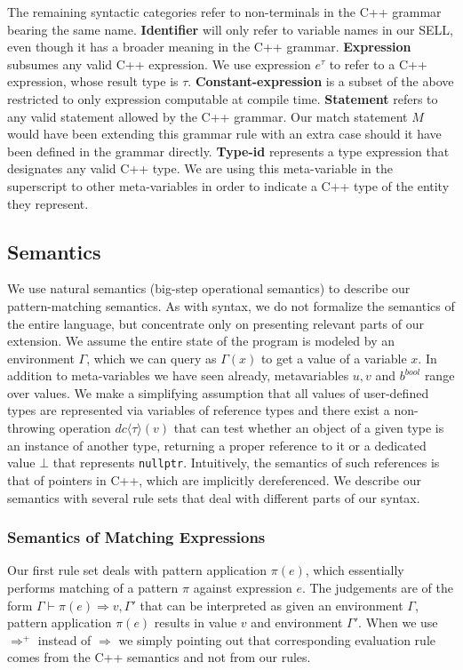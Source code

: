 \documentclass[preprint]{sigplanconf}
\makeatletter
\DeclareRobustCommand{\code}[1]{{\lstinline[breaklines=false,escapechar=@]{#1}}}
\newcommand{\evals}{\Rightarrow}
\newcommand{\evalspp}{\Rightarrow^+}
\newcommand{\DynCast}[2]{\ensuremath{dc\langle{#1}\rangle({#2})}}
\newcommand{\nullptr}{\ensuremath{\bot}}
\makeatother
\begin{document}
The remaining syntactic categories refer to non-terminals in the C++ grammar 
bearing the same name. {\bf Identifier} will only refer to variable names in our 
SELL, even though it has a broader meaning in the C++ grammar. {\bf Expression}
subsumes any valid C++ expression. We use expression $e^\tau$ to refer to a C++ 
expression, whose result type is $\tau$. {\bf Constant-expression} is a subset 
of the above restricted to only expression computable at compile time. {\bf 
Statement} refers to any valid statement allowed by the C++ grammar. Our match 
statement $M$ would have been extending this grammar rule with an extra case 
should it have been defined in the grammar directly. {\bf Type-id} represents a 
type expression that designates any valid C++ type. We are using this 
meta-variable in the superscript to other meta-variables in order to indicate a 
C++ type of the entity they represent.

\subsection{Semantics}
\label{sec:sem}

We use natural semantics\cite{Kahn87} (big-step operational semantics) to 
describe our pattern-matching semantics. As with syntax, we do not formalize the 
semantics of the entire language, but concentrate only on presenting relevant 
parts of our extension. We assume the entire state of the program is modeled by 
an environment $\Gamma$, which we can query as $\Gamma(x)$ to get a value of a 
variable $x$. In addition to meta-variables we have seen already, metavariables 
$u,v$ and $b^{bool}$ range over values. We make a simplifying assumption that 
all values of user-defined types are represented via variables of reference 
types and there exist a non-throwing operation \DynCast{\tau}{v} that can test 
whether an object of a given type is an instance of another type, returning a 
proper reference to it or a dedicated value \nullptr{} that represents 
\code{nullptr}. Intuitively, the semantics of such references is that of 
pointers in C++, which are implicitly dereferenced. We describe our semantics 
with several rule sets that deal with different parts of our syntax.

\subsubsection{Semantics of Matching Expressions}
\label{sec:semme}

Our first rule set deals with pattern application $\pi(e)$, which essentially 
performs matching of a pattern $\pi$ against expression $e$. The judgements are of 
the form $\Gamma\vdash \pi(e) \evals v,\Gamma'$ that can be interpreted as given 
an environment $\Gamma$, pattern application $\pi(e)$ results in value $v$ and 
environment $\Gamma'$. When we use $\evalspp$ instead of $\evals$ we simply 
pointing out that corresponding evaluation rule comes from the C++ semantics and 
not from our rules.
\end{document}

